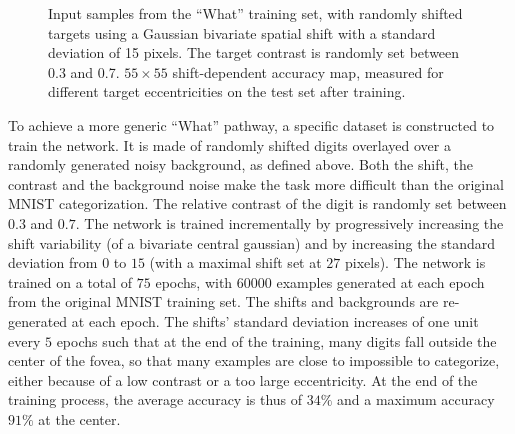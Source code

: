 \begin{figure}[t!]%
	\caption{\A Input samples from the ``What'' training set, with  randomly shifted targets using a Gaussian bivariate spatial shift with a standard deviation of 15 pixels. The target contrast is randomly set between 0.3 and 0.7.
	\B $55 \times 55$ shift-dependent accuracy map, measured for different target eccentricities on the test set after training.
	}
\label{fig:accuracy}
\end{figure}

To achieve a more generic ``What'' pathway, a specific dataset is constructed to train the network. It is made of randomly shifted digits overlayed over a randomly generated noisy background, as defined above. Both the shift, the contrast and the background noise make the task more difficult than the original MNIST categorization. The relative contrast of the digit is randomly set between $0.3$ and $0.7$.  The network is trained incrementally by progressively increasing the shift variability (of a bivariate central gaussian) and by increasing the standard deviation from $0$ to $15$ (with a maximal shift set at $27$ pixels). The network is trained on a total of $75$ epochs, with $60000$ examples generated at each epoch from the original MNIST training set. The shifts and backgrounds are re-generated at each epoch. The shifts' standard deviation increases of one unit every $5$ epochs such that at the end of the training, many digits fall outside the center of the fovea, so that many examples are close to impossible to categorize, either because of a low contrast or a too large eccentricity. At the end of the training process, the average accuracy is thus of $34\%$ and a maximum accuracy $91\%$ at the center.

